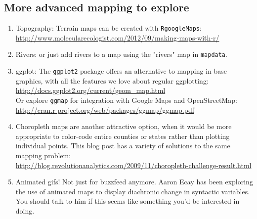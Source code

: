 \documentclass[12pt]{article}
\begin{document}
\subsection{More advanced mapping to explore}
\begin{enumerate}
\item Topography: Terrain maps can be created with \texttt{RgoogleMaps}:\\ \url{http://www.molecularecologist.com/2012/09/making-maps-with-r/}
\item Rivers: or just add rivers to a map using the "rivers" map in \texttt{mapdata}.
\item ggplot: The \texttt{ggplot2} package offers an alternative to mapping in base graphics, with all the features we love about regular ggplotting:\\
\url{http://docs.ggplot2.org/current/geom_map.html}\\
Or explore \texttt{ggmap} for integration with Google Maps and OpenStreetMap:\\
\url{http://cran.r-project.org/web/packages/ggmap/ggmap.pdf}
\item Choropleth maps are another attractive option, when it would be more appropriate to color-code entire counties or states rather than plotting individual points. This blog post has a variety of solutions to the same mapping problem:\\
\url{http://blog.revolutionanalytics.com/2009/11/choropleth-challenge-result.html}
\item Animated gifs! Not just for buzzfeed anymore. Aaron Ecay has been exploring the use of animated maps to display diachronic change in syntactic variables. You should talk to him if this seems like something you'd be interested in doing.
\end{enumerate}
\end{document}
